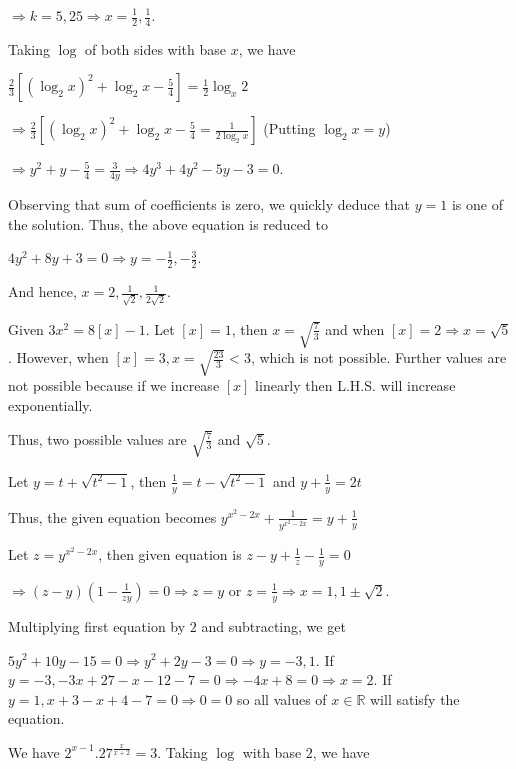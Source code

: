   $\Rightarrow k = 5, 25 \Rightarrow x = \frac{1}{2}, \frac{1}{4}$.
\item Taking $\log$ of both sides with base $x$, we have

  $\tfrac{2}{3}\left[(\log_2x)^2 + \log_2x - \tfrac{5}{4}\right] = \frac{1}{2}\log_x2$

  $\Rightarrow \frac{2}{3}\left[(\log_2x)^2 + \log_2x - \frac{5}{4} = \frac{1}{2\log_2x}\right]$ (Putting $\log_2x = y$)

  $\Rightarrow y^2 + y - \frac{5}{4} = \frac{3}{4y} \Rightarrow 4y^3 + 4y^2 - 5y - 3 = 0$.

  Observing that sum of coefficients is zero, we quickly deduce that $y = 1$ is one of the solution. Thus,
  the above equation is reduced to

  $4y^2 + 8y + 3 = 0 \Rightarrow y = -\frac{1}{2}, -\frac{3}{2}$.

  And hence, $x = 2, \frac{1}{\sqrt{2}}, \frac{1}{2\sqrt{2}}$.
\item Given $3x^2 = 8[x] - 1$. Let $[x] = 1$, then $x = \sqrt{\frac{7}{3}}$ and when $[x] = 2 \Rightarrow x
  = \sqrt{5}$. However, when $[x] = 3, x = \sqrt{\frac{23}{3}} < 3$, which is not possible. Further values
  are not possible because if we increase $[x]$ linearly then L.H.S. will increase exponentially.

  Thus, two possible values are $\sqrt{\frac{7}{3}}$ and $\sqrt{5}$.
\item Let $y = t + \sqrt{t^2 - 1}$, then $\frac{1}{y} = t - \sqrt{t^2 - 1}$ and $y + \frac{1}{y} = 2t$

  Thus, the given equation becomes $y^{x^2 - 2x} + \frac{1}{y^{x^2 - 2x}} = y + \frac{1}{y}$

  Let $z = y^{x^2 - 2x}$, then given equation is $z - y + \frac{1}{z} - \frac{1}{y} = 0$

  $\Rightarrow (z - y)\left(1 - \frac{1}{zy}\right) = 0\Rightarrow z = y$ or $z = \frac{1}{y}\Rightarrow x =
  1, 1\pm\sqrt{2}$.
\item Multiplying first equation by $2$ and subtracting, we get

  $5y^2 + 10y -15 = 0 \Rightarrow y^2 + 2y - 3 = 0 \Rightarrow y = -3, 1$. If $y = -3, -3x + 27 - x - 12 - 7
  = 0 \Rightarrow -4x + 8 = 0\Rightarrow x = 2$. If $y = 1, x + 3 - x + 4 - 7 = 0\Rightarrow 0 = 0$ so all
  values of $x\in\mathbb{R}$ will satisfy the equation.
\item We have $2^{x - 1}.27^{\tfrac{x}{x + 2}} = 3$. Taking $\log$ with base $2$, we have

